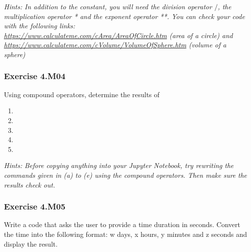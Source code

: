 \textit{Hints:
In addition to the {} constant, you will need the division operator $/$, the multiplication operator * and the exponent operator **. You can check your code with the following links:\\
\url{https://www.calculateme.com/cArea/AreaOfCircle.htm} (area of a circle) and
\url{https://www.calculateme.com/cVolume/VolumeOfSphere.htm} (volume of a sphere)}\\[1cm]



\subsubsection*{Exercise 4.M04}
Using compound operators, determine the results of
\begin{enumerate}[label=(\alph*)]
	\item {}
	\item {}
	\item {}
	\item {}
	\item {}
\end{enumerate}	
	
\textit{Hints:
Before copying anything into your Jupyter Notebook, try rewriting the commands given in (a)
to (e) using the compound operators. Then make sure the results check out.}\\[1cm]



\subsubsection*{Exercise 4.M05 \red{[M]}}
Write a code that asks the user to provide a time duration in seconds. Convert the time into
the following format: w days, x hours, y minutes and z seconds and display the result.\\

